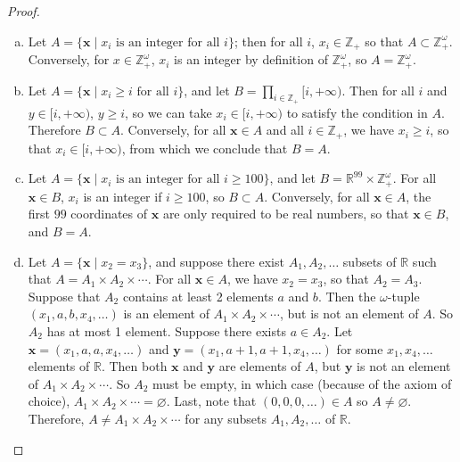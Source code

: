 \documentclass[11pt,a4paper,twoside]{article}
\theoremstyle{definition}
\begin{document}
\begin{proof}\hfill
  
  \begin{enumerate}[(a)]

  \item Let $A = \{ \mathbf{x} \mid x_i \text{ is an integer for all } i \}$; then for all $i$, $x_i \in \mathbb{Z}_+$ so that $A \subset \mathbb{Z}_+^\omega$.
    Conversely, for $x \in \mathbb{Z}_+^\omega$, $x_i$ is an integer by definition of $\mathbb{Z}_+^\omega$, so $A = \mathbb{Z}_+^\omega$.

  \item Let $A = \{ \mathbf{x} \mid x_i \geq i \text{ for all } i \}$, and let $B = \prod_{i \in \mathbb{Z}_+} [i, {+\infty})$.
    Then for all $i$ and $y \in [i, {+\infty})$, $y \geq i$, so we can take $x_i \in [i, {+\infty})$ to satisfy the condition in $A$. Therefore $B \subset A$.
    Conversely, for all $\mathbf{x} \in A$ and all $i \in \mathbb{Z}_+$, we have $x_i \geq i$, so that $x_i \in [i, {+\infty})$, from which we conclude that $B = A$.

  \item Let $A = \{ \mathbf{x} \mid x_i \text{ is an integer for all } i \geq 100 \}$, and let $B = \mathbb{R}^{99} \times \mathbb{Z}_+^\omega$.
    For all $\mathbf{x} \in B$, $x_i$ is an integer if $i \geq 100$, so $B \subset A$.
    Conversely, for all $\mathbf{x} \in A$, the first $99$ coordinates of $\mathbf{x}$ are only required to be real numbers, so that $\mathbf{x} \in B$, and $B = A$.

  \item Let $A = \{ \mathbf{x} \mid x_2 = x_3 \}$, and suppose there exist $A_1, A_2, \dotsc$ subsets of $\mathbb{R}$ such that $A = A_1 \times A_2 \times \dotsb$.
    For all $\mathbf{x} \in A$, we have $x_2 = x_3$, so that $A_2 = A_3$. Suppose that $A_2$ contains at least 2 elements $a$ and $b$.
    Then the $\omega$-tuple $(x_1, a, b, x_4, \dotsc)$ is an element of $A_1 \times A_2 \times \dotsb$, but is not an element of $A$. So $A_2$ has at most 1 element.
    Suppose there exists $a \in A_2$. Let $\mathbf{x} = ( x_1, a, a, x_4, \dotsc )$ and $\mathbf{y} = (x_1, a + 1, a + 1, x_4, \dotsc)$ for some $x_1, x_4, \dotsc$ elements of $\mathbb{R}$.
    Then both $\mathbf{x}$ and $\mathbf{y}$ are elements of $A$, but $\mathbf{y}$ is not an element of $A_1 \times A_2 \times \dotsb$. So $A_2$ must be empty,
    in which case (because of the axiom of choice), $A_1 \times A_2 \times \dotsb = \varnothing$. Last, note that $(0, 0, 0, \dotsc) \in A$ so $A \neq \varnothing$.
    Therefore, $A \neq A_1 \times A_2 \times \dotsb$ for any subsets $A_1, A_2, \dotsc$ of $\mathbb{R}$.

  \end{enumerate}

\end{proof}
\end{document}
